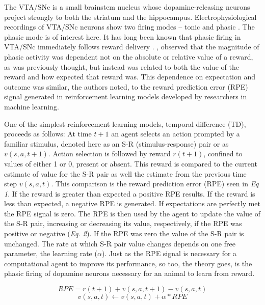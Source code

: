 \documentclass[doc]{apa}        %
\begin{document}
The VTA/SNc is a small brainstem nucleus whose dopamine-releasing neurons project strongly to both the striatum and the hippocampus.  Electrophysiological recordings of VTA/SNc neurons show two firing modes -- tonic and phasic \cite{DawNW:2006p6343}.  The phasic mode is of interest here.  It has long been known that phasic firing in VTA/SNc immediately follows reward delivery \cite{iversen:2007aa}. , observed that the magnitude of phasic activity was dependent not on the absolute or relative value of a reward, as was previously thought, but instead was related to both the value of the reward and how expected that reward was.  This dependence on expectation and outcome was similar, the authors noted, to the reward prediction error (RPE) signal generated in reinforcement learning models developed by researchers in machine learning.  

One of the simplest reinforcement learning models, temporal difference (TD), proceeds as follows: At time $t+1$ an agent selects an action prompted by a familiar stimulus, denoted here as an S-R (stimulus-response) pair or as $v(s,a,t+1)$. Action selection is followed by reward $r(t+1)$, confined to values of either 1 or 0, present or absent.  This reward is compared to the current estimate of value for the S-R pair as well the estimate from the previous time step $v(s,a,t)$.  This comparison is the reward prediction error (RPE) seen in \emph{Eq 1}.   If the reward is greater than expected a positive RPE results.  If the reward is less than expected, a negative RPE is generated.  If expectations are perfectly met the RPE signal is zero.  The RPE is then used by the agent to update the value of the S-R pair, increasing or decreasing its value, respectively, if the RPE was positive or negative (\emph{Eq. 2}).  If the RPE was zero the value of the S-R pair is unchanged.  The rate at which S-R pair value changes depends on one free parameter, the learning rate ($\alpha$).  Just as the RPE signal is necessary for a computational agent to improve its performance, so too, the theory goes, is the phasic firing of dopamine neurons necessary for an animal to learn from reward.

\begin{equation} RPE = r(t+1) + v(s,a,t+1) - v(s,a,t) 	\end{equation}
\begin{equation} v(s,a,t) \leftarrow v(s,a,t) + \alpha*RPE \end{equation}
\end{document}
